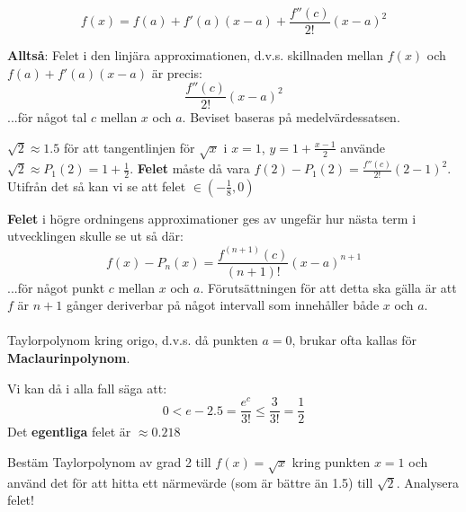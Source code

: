 \documentclass{report}
\begin{document}
\vspace{20pt}
{
\begin{equation*}
f(x) = f(a) + f'(a)(x-a) + \frac{f''(c)}{2!} (x-a)^2
\end{equation*}
}

\noindent
\textbf{Alltså}: Felet i den linjära approximationen, d.v.s. skillnaden mellan $ f(x) $ och $ f(a) + f'(a)(x-a) $ är precis:
\begin{equation*}
\frac{f''(c)}{2!} (x-a)^2
\end{equation*}
...för något tal $ c $ mellan $ x $ och $ a $.
Beviset baseras på medelvärdessatsen.

\vspace{20pt}
{
	$ \sqrt{2} \approx 1.5 $ för att tangentlinjen för $ \sqrt{x}  $ i $ x = 1 $, $ y = 1 + \frac{x-1}{2}  $ använde $ \sqrt{2} \approx P_1(2) = 1 + \frac{1}{2}  $. \textbf{Felet} måste då vara $ f(2) - P_1(2) = \frac{f''(c)}{2!} (2-1)^2 $. Utifrån det så kan vi se att felet $ \in ( - \frac{1}{8} , 0) $ 
} 

{
\textbf{Felet} i högre ordningens approximationer ges av ungefär hur nästa term i utvecklingen skulle se ut så där:
\begin{equation*}
	f(x) - P_n(x) = \frac{f^{(n+1)}(c)}{(n+1)!}(x-a)^{n+1} 
\end{equation*}
...för något punkt $ c $ mellan $ x $ och $ a $. Förutsättningen för att detta ska gälla är att $ f $ är $ n+1 $ gånger deriverbar på något intervall som innehåller både $ x $ och $ a $.\\\\

\noindent
Taylorpolynom kring origo, d.v.s. då punkten $ a = 0 $, brukar ofta kallas för \textbf{Maclaurinpolynom}.
}

{
Vi kan då i alla fall säga att:
\begin{equation*}
0 < e - 2.5 = \frac{e^c}{3!} \le \frac{3}{3!} = \frac{1}{2}  
\end{equation*}
Det \textbf{egentliga} felet är $ \approx 0.218 $ 
}

\vspace{20pt}
\qs{}
{
Bestäm Taylorpolynom av grad 2 till $ f(x) = \sqrt{x}  $ kring punkten $ x = 1 $ och använd det för att hitta ett närmevärde (som är bättre än 1.5) till $ \sqrt{2}  $. Analysera felet!
}
\end{document}
